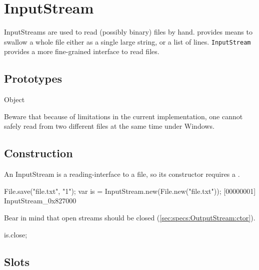 
\section{InputStream}

InputStreams are used to read (possibly binary) files by hand.
 provides means to swallow a whole file either as a
single large string, or a list of lines.  \lstinline|InputStream|
provides a more fine-grained interface to read files.

\subsection{Prototypes}
\begin{refObjects}
\item[Object]
\end{refObjects}

\begin{windows}
  Beware that because of limitations in the current implementation,
  one cannot safely read from two different files at the same time
  under Windows.
\end{windows}

\subsection{Construction}

An InputStream is a reading-interface to a file, so its constructor
requires a .

\begin{urbiscript}[firstnumber=1]
File.save("file.txt", "1\n");
var is = InputStream.new(File.new("file.txt"));
[00000001] InputStream_0x827000
\end{urbiscript}

Bear in mind that open streams should be closed
(\autoref{sec:specs:OutputStream:ctor}).

\begin{urbiscript}
is.close;
\end{urbiscript}

\subsection{Slots}

